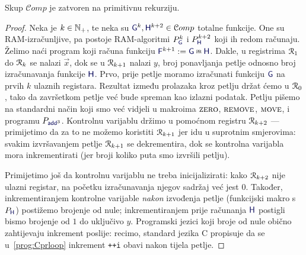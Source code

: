 \begin{lema}[{name=[zatvorenost skupa $\mathcal Comp$ na primitivnu rekurziju]}]\label{lm:prram}
Skup $\mathcal Comp$ je zatvoren na primitivnu rekurziju.
\end{lema}
\begin{proof}
Neka je $k\in{\mathbb N}_+$, te neka su $\f G^k,\f H^{k+2}\in\mathcal Comp$ totalne funkcije. One su RAM-izračunljive, pa postoje RAM-algoritmi $P_{\f G}^k$ i $P_{\f H}^{k+2}$ koji ih redom računaju. Želimo naći program koji računa funkciju $\f F^{k+1}:=\f G\pr\f H$. Dakle, u registrima $\mathcal R_{1}$ do $\mathcal R_{k}$ se nalazi $\vec x$, dok se u $\mathcal R_{k+1}$ nalazi $y$, broj ponavljanja petlje odnosno broj izračunavanja funkcije $\f H$. Prvo, prije petlje moramo izračunati funkciju $\f G$ na prvih $k$ ulaznih registara. Rezultat između prolazaka kroz petlju držat ćemo u $\mathcal R_{0}$, tako da završetkom petlje već bude spreman kao izlazni podatak. Petlju pišemo na standardni način koji smo već vidjeli u makroima $\textsc{zero}$, $\textsc{remove}$, $\textsc{move}$, i programu $P_{\f{add}^3}$. Kontrolnu varijablu držimo u pomoćnom registru $\mathcal R_{k+2}$ --- primijetimo da za to ne možemo koristiti $\mathcal R_{k+1}$ jer idu u suprotnim smjerovima: svakim izvršavanjem petlje $\mathcal R_{k+1}$ se dekrementira, dok se kontrolna varijabla mora inkrementirati (jer broji koliko puta smo izvršili petlju).

    Primijetimo još da kontrolnu varijablu ne treba inicijalizirati: kako $\mathcal R_{k+2}$ nije ulazni registar, na početku izračunavanja njegov sadržaj već jest $0$. Također, inkrementiranjem kontrolne varijable \emph{nakon} izvođenja petlje (funkcijski makro s $P_{\f H}$) postižemo brojenje od nule; inkrementiranjem prije računanja $\f H$ postigli bismo brojenje od $1$ do uključivo $y$. Programski jezici koji broje od nule obično zahtijevaju inkrement poslije: recimo, standard jezika C propisuje da se u~\eqref{prog:Cprloop} inkrement \texttt{++i} obavi nakon tijela petlje.


\end{proof}

